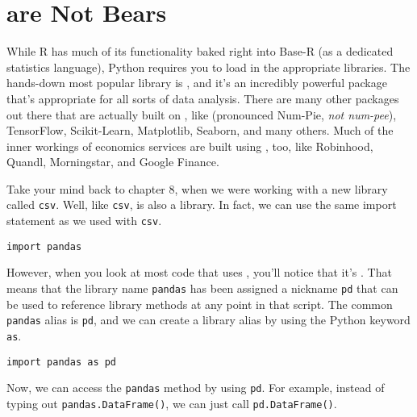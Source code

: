\section{ are Not Bears}
While R has much of its functionality baked right into Base-R (as a dedicated statistics language), Python requires you to load in the appropriate libraries. The hands-down most popular library is , and it's an incredibly powerful package that's appropriate for all sorts of data analysis. There are many other packages out there that are actually built on , like  (pronounced Num-Pie, \textit{not num-pee}), TensorFlow, Scikit-Learn, Matplotlib, Seaborn, and many others. Much of the inner workings of economics services are built using , too, like Robinhood, Quandl, Morningstar, and Google Finance.\par
{}
Take your mind back to chapter 8, when we were working with a new library called \verb|csv|. Well, like \verb|csv|,  is also a library. In fact, we can use the same import statement as we used with \verb|csv|.
\begin{lstlisting}[style=pippython]
import pandas
\end{lstlisting}
However, when you look at most code that uses , you'll notice that it's . That means that the library name \verb|pandas| has been assigned a nickname \verb|pd| that can be used to reference library methods at any point in that script. The common \verb|pandas| alias is \verb|pd|, and we can create a library alias by using the Python keyword \verb|as|.
\begin{lstlisting}[style=pippython]
import pandas as pd
\end{lstlisting}
Now, we can access the \verb|pandas| method by using \verb|pd|. For example, instead of typing out \verb|pandas.DataFrame()|, we can just call \verb|pd.DataFrame()|.\par
{}
 
